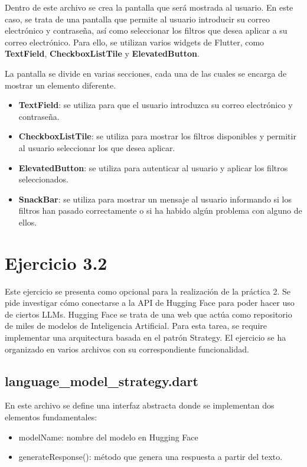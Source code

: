 \documentclass[12pt]{article}
\begin{document}
Dentro de este archivo se crea la pantalla que será mostrada al usuario. En este caso, se trata de una pantalla que permite al usuario introducir su correo electrónico y contraseña, así como seleccionar los filtros que desea aplicar a su correo electrónico. Para ello, se utilizan varios widgets de Flutter, como \textbf{TextField}, \textbf{CheckboxListTile} y \textbf{ElevatedButton}.

La pantalla se divide en varias secciones, cada una de las cuales se encarga de mostrar un elemento diferente.

\begin{itemize}
    \item \textbf{TextField}: se utiliza para que el usuario introduzca su correo electrónico y contraseña.
    \item \textbf{CheckboxListTile}: se utiliza para mostrar los filtros disponibles y permitir al usuario seleccionar los que desea aplicar.
    \item \textbf{ElevatedButton}: se utiliza para autenticar al usuario y aplicar los filtros seleccionados.
    \item \textbf{SnackBar}: se utiliza para mostrar un mensaje al usuario informando si los filtros han pasado correctamente o si ha habido algún problema con alguno de ellos.
\end{itemize}

\newpage

\section{Ejercicio 3.2}
Este ejercicio se presenta como opcional para la realización de la práctica 2. Se pide investigar cómo conectarse a la API de Hugging Face para poder hacer uso de ciertos LLMs. Hugging Face se trata de una web que actúa como repositorio de miles de modelos de Inteligencia Artificial.
Para esta tarea, se require implementar una arquitectura basada en el patrón Strategy. El ejercicio se ha organizado en varios archivos con su correspondiente funcionalidad.

\subsection{language\_model\_strategy.dart}
En este archivo se define una interfaz abstracta donde se implementan dos elementos fundamentales:

\begin{itemize}
    \item modelName: nombre del modelo en Hugging Face
    \item generateResponse(): método que genera una respuesta a partir del texto.
\end{itemize}
\end{document}

